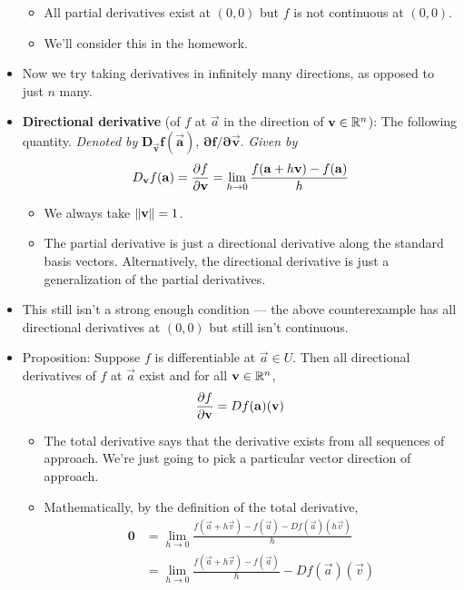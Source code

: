 \documentclass[../notes.tex]{subfiles}
\begin{document}
\begin{itemize}
\begin{itemize}
        \item All partial derivatives exist at $(0,0)$ but $f$ is not continuous at $(0,0)$.
        \item We'll consider this in the homework.
    \end{itemize}
    \item Now we try taking derivatives in infinitely many directions, as opposed to just $n$ many.
    \item \textbf{Directional derivative} (of $f$ at $\vec{a}$ in the direction of $\mathbf{v}\in\mathbb{R}^n$): The following quantity. \emph{Denoted by} $\bm{D_\vec{v}f(\vec{a})}$, $\bm{\partial f/\partial\vec{v}}$. \emph{Given by}
    \begin{equation*}
        D_\mathbf{v}f(\mathbf{a}) = \pdv{f}{\mathbf{v}} = \lim_{h\to 0}\frac{f(\mathbf{a}+h\mathbf{v})-f(\mathbf{a})}{h}
    \end{equation*}
    \begin{itemize}
        \item We always take $\norm{\mathbf{v}}=1$.
        \item The partial derivative is just a directional derivative along the standard basis vectors. Alternatively, the directional derivative is just a generalization of the partial derivatives.
    \end{itemize}
    \item This still isn't a strong enough condition --- the above counterexample has all directional derivatives at $(0,0)$ but still isn't continuous.
    \item Proposition: Suppose $f$ is differentiable at $\vec{a}\in U$. Then all directional derivatives of $f$ at $\vec{a}$ exist and for all $\mathbf{v}\in\mathbb{R}^n$,
    \begin{equation*}
        \pdv{f}{\mathbf{v}}(\mathbf{a}) = Df(\mathbf{a})(\mathbf{v})
    \end{equation*}
    \begin{itemize}
        \item The total derivative says that the derivative exists from all sequences of approach. We're just going to pick a particular vector direction of approach.
        \item Mathematically, by the definition of the total derivative,
        \begin{align*}
            \bm{0} &= \lim_{h\to 0}\frac{f(\vec{a}+h\vec{v})-f(\vec{a})-Df(\vec{a})(h\vec{v})}{h}\\
            &= \lim_{h\to 0}\frac{f(\vec{a}+h\vec{v})-f(\vec{a})}{h}-Df(\vec{a})(\vec{v})\\

\end{align*}
\end{itemize}
\end{itemize}
\end{document}

